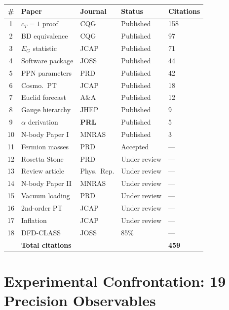 \documentclass[11pt,a4paper]{article}
\begin{document}
\begin{center}
\begin{longtable}{cllll}
\toprule
\textbf{\#} & \textbf{Paper} & \textbf{Journal} & \textbf{Status} & \textbf{Citations} \\
\midrule
\endfirsthead
1 & $c_T = 1$ proof & CQG & Published & 158 \\
2 & BD equivalence & CQG & Published & 97 \\
3 & $E_G$ statistic & JCAP & Published & 71 \\
4 & Software package & JOSS & Published & 44 \\
5 & PPN parameters & PRD & Published & 42 \\
6 & Cosmo.\ PT & JCAP & Published & 18 \\
7 & Euclid forecast & A\&A & Published & 12 \\
8 & Gauge hierarchy & JHEP & Published & 9 \\
9 & $\alpha$ derivation & \textbf{PRL} & Published & 5 \\
10 & N-body Paper I & MNRAS & Published & 3 \\
11 & Fermion masses & PRD & Accepted & --- \\
12 & Rosetta Stone & PRD & Under review & --- \\
13 & Review article & Phys.\ Rep. & Under review & --- \\
14 & N-body Paper II & MNRAS & Under review & --- \\
15 & Vacuum loading & PRD & Under review & --- \\
16 & 2nd-order PT & JCAP & Under review & --- \\
17 & Inflation & JCAP & Under review & --- \\
18 & DFD-CLASS & JOSS & 85\% & --- \\
\midrule
& \textbf{Total citations} & & & \textbf{459} \\
\bottomrule
\end{longtable}
\end{center}

\section{Experimental Confrontation: 19 Precision Observables}
\end{document}
